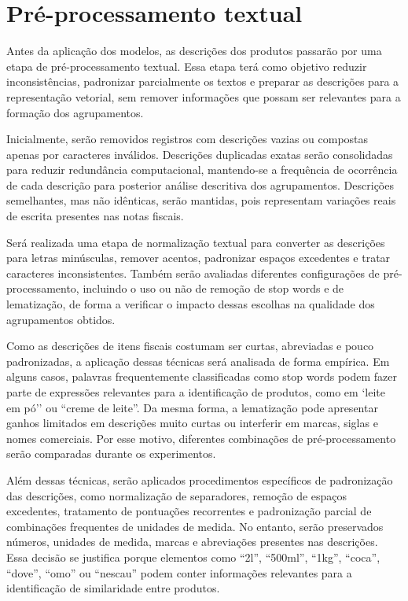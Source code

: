\documentclass[english,brazilian]{UNISINOSmonografia}
\begin{document}
\section{Pré-processamento textual}

Antes da aplicação dos modelos, as descrições dos produtos passarão por uma etapa de pré-processamento textual. Essa etapa terá como objetivo reduzir inconsistências, padronizar parcialmente os textos e preparar as descrições para a representação vetorial, sem remover informações que possam ser relevantes para a formação dos agrupamentos.

Inicialmente, serão removidos registros com descrições vazias ou compostas apenas por caracteres inválidos. Descrições duplicadas exatas serão consolidadas para reduzir redundância computacional, mantendo-se a frequência de ocorrência de cada descrição para posterior análise descritiva dos agrupamentos. Descrições semelhantes, mas não idênticas, serão mantidas, pois representam variações reais de escrita presentes nas notas fiscais.

Será realizada uma etapa de normalização textual para converter as descrições para letras minúsculas, remover acentos, padronizar espaços excedentes e tratar caracteres inconsistentes. Também serão avaliadas diferentes configurações de pré-processamento, incluindo o uso ou não de remoção de stop words e de lematização, de forma a verificar o impacto dessas escolhas na qualidade dos agrupamentos obtidos.

Como as descrições de itens fiscais costumam ser curtas, abreviadas e pouco padronizadas, a aplicação dessas técnicas será analisada de forma empírica. Em alguns casos, palavras frequentemente classificadas como stop words podem fazer parte de expressões relevantes para a identificação de produtos, como em `leite em pó'' ou ``creme de leite''. Da mesma forma, a lematização pode apresentar ganhos limitados em descrições muito curtas ou interferir em marcas, siglas e nomes comerciais. Por esse motivo, diferentes combinações de pré-processamento serão comparadas durante os experimentos.

Além dessas técnicas, serão aplicados procedimentos específicos de padronização das descrições, como normalização de separadores, remoção de espaços excedentes, tratamento de pontuações recorrentes e padronização parcial de combinações frequentes de unidades de medida. No entanto, serão preservados números, unidades de medida, marcas e abreviações presentes nas descrições. Essa decisão se justifica porque elementos como ``2l'', ``500ml'', ``1kg'', ``coca'', ``dove'', ``omo'' ou ``nescau'' podem conter informações relevantes para a identificação de similaridade entre produtos.
\end{document}
